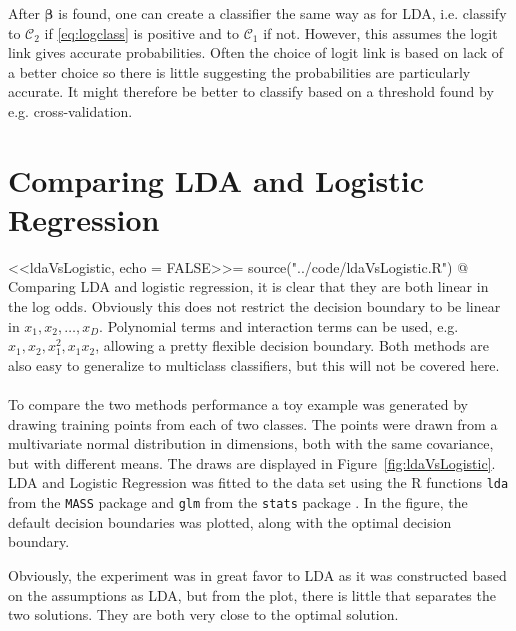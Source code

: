 After $\bm \beta$ is found, one can create a classifier the same way as for LDA, i.e. classify to $\mathcal{C}_2$ if \eqref{eq:logclass} is positive and to $\mathcal{C}_1$ if not. However, this assumes the logit link gives accurate probabilities. Often the choice of logit link is based on lack of a better choice so there is little suggesting the probabilities are particularly accurate. It might therefore be better to classify based on a threshold found by e.g. cross-validation.
%
\section{Comparing LDA and Logistic Regression}
\label{sub:LDA and Logistic Regre}
<<ldaVsLogistic, echo = FALSE>>=
source("../code/ldaVsLogistic.R")
@
Comparing LDA and logistic regression, it is clear that they are both linear in the log odds. Obviously this does not restrict the decision boundary to be linear in $x_1, x_2, \ldots , x_D$. Polynomial terms and interaction terms can be used, e.g. $x_1, x_2, x_1^2, x_1 x_2$, allowing a pretty flexible decision boundary. Both methods are also easy to generalize to multiclass classifiers, but this will not be covered here. 
\\
\\
To compare the two methods performance a toy example was generated by drawing  training points from each of two classes. The points were drawn from a multivariate normal distribution in  dimensions, both with the same covariance, but with different means. The draws are displayed in Figure~\ref{fig:ldaVsLogistic}. LDA and Logistic Regression was fitted to the data set using the R functions \verb+lda+ from the \verb+MASS+ package \citep{mass} and \verb+glm+ from the \verb+stats+ package \citep{stats}. In the figure, the default decision boundaries was plotted, along with the optimal decision boundary.

Obviously, the experiment was in great favor to LDA as it was constructed based on the assumptions as LDA, but from the plot, there is little that separates the two solutions. They are both very close to the optimal solution.


